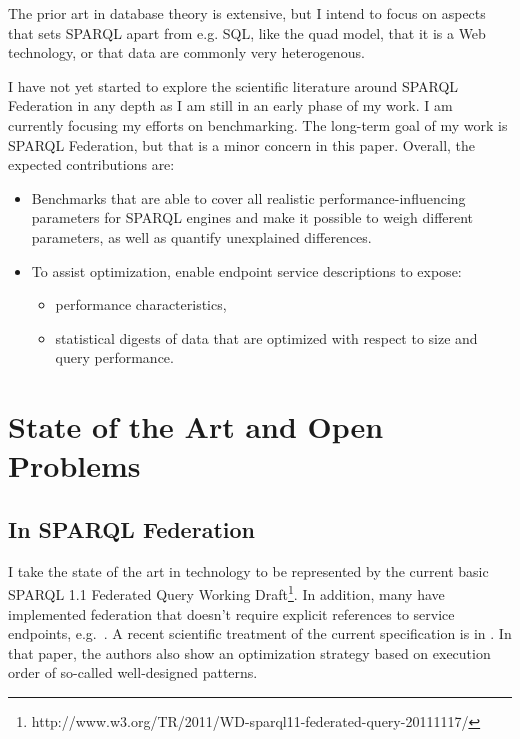 \documentclass{llncs}
\begin{document}
The prior art in database theory is extensive, but I intend to focus
on aspects that sets SPARQL apart from e.g. SQL, like the quad model,
that it is a Web technology, or that data are commonly very
heterogenous.

I have not yet started to explore the scientific literature around
SPARQL Federation in any depth as I am still in an early phase of my
work. I am currently focusing my efforts on benchmarking. The
long-term goal of my work is SPARQL Federation, but that is a minor
concern in this paper. Overall, the expected contributions are:

\begin{itemize}
\item Benchmarks that are able to cover all realistic
  performance-influencing parameters for SPARQL engines and make it
  possible to weigh different parameters, as well as quantify
  unexplained differences. 

\item To assist optimization, enable endpoint service descriptions to
  expose:
\begin{itemize}
\item performance characteristics,
\item statistical digests of data that are optimized with respect to
  size and query performance.
\end{itemize}
\end{itemize}


\section{State of the Art and Open Problems}

\subsection{In SPARQL Federation}

I take the state of the art in technology to be represented by the
current basic SPARQL 1.1 Federated Query Working
Draft\footnote{http://www.w3.org/TR/2011/WD-sparql11-federated-query-20111117/}. In
addition, many have implemented federation that doesn't require 
explicit references to service endpoints, e.g.~\cite{springerlink:10.1007/978-3-642-25073-6-38}.
A recent scientific treatment of the current specification is in
\cite{springerlink:10.1007/978-3-642-21064-8-1}. In that paper, the
authors also show an optimization strategy based on execution order of
so-called well-designed patterns.
\end{document}
